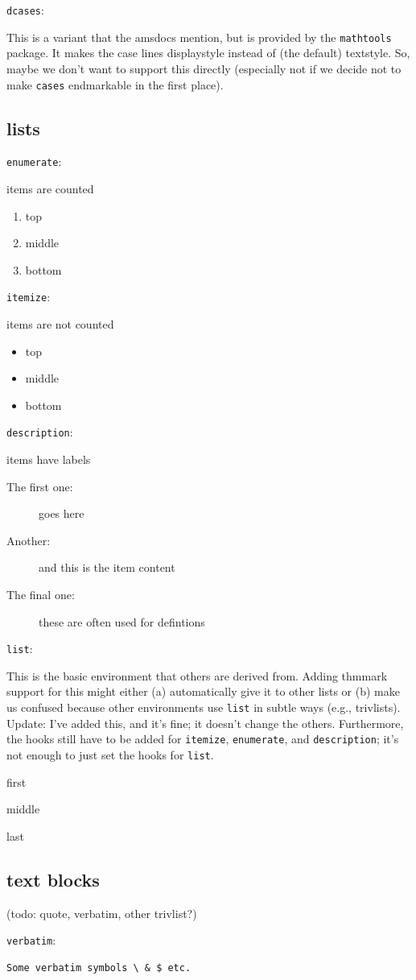 \documentclass[leqno]{article}
\newcommand{\testtype}[2]{\texttt{#1}:%
  #2}
\newcommand{\makeoutertest}[3]{
  \begin{test}
    \testtype{#1}{#2}
    #3
  \end{test}
}
\newcommand{\maketest}[3]{
  \makeoutertest{#1}{#2}{
    \begin{#1}
      #3
    \end{#1}
  }
}
\begin{document}
\makeoutertest{dcases}{
  This is a variant that the amsdocs mention, but is provided by the \texttt{mathtools} package.
  It makes the case lines displaystyle instead of (the default) textstyle.
  So, maybe we don't want to support this directly (especially not if we decide not to make \texttt{cases} endmarkable in the first place).
}{
  \break [\emph{no example here}]
}

\subsection{lists}

\maketest{enumerate}{
  items are counted
}{
\item top
\item middle
\item bottom
}
\maketest{itemize}{
  items are not counted
}{
\item top
\item middle
\item bottom
}
\maketest{description}{
  items have labels
}{
\item[The first one:] goes here
\item[Another:] and this is the item content
\item[The final one:] these are often used for defintions
}
\makeoutertest{list}{
  This is the basic environment that others are derived from.
  Adding thmmark support for this might either (a) automatically give it to other lists or (b) make us confused because other environments use \texttt{list} in subtle ways (e.g., trivlists).\\
  Update: I've added this, and it's fine; it doesn't change the others.  Furthermore, the hooks still have to be added for \texttt{itemize}, \texttt{enumerate}, and \texttt{description}; it's not enough to just set the hooks for \texttt{list}.
}{
  \begin{list}{}{}
  \item first
  \item middle
  \item last
  \end{list}
}


\subsection{text blocks}

(todo: quote, verbatim, other trivlist?)

\begin{test} %
  \texttt{verbatim}:
\begin{verbatim}
Some verbatim symbols \ & $ etc.
\end{verbatim}
\end{test}
\end{document}
